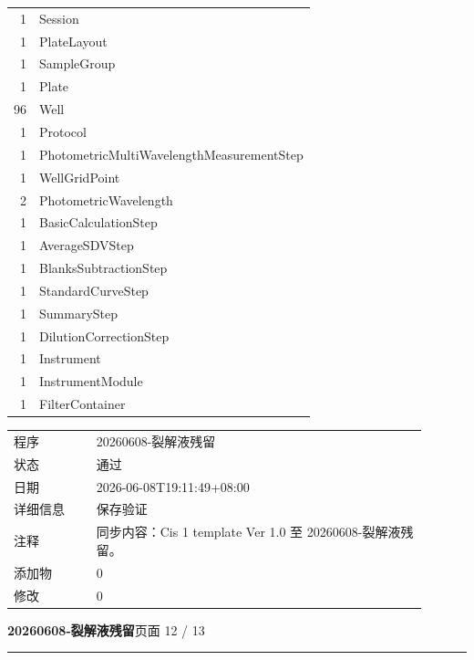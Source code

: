 \documentclass[UTF8,10pt,a4paper,fontset=fandol]{ctexart}
\newcommand{\fieldvalue}[1]{#1}
\begin{document}
\begin{tabular}{@{}r l@{}}
1 & Session\\
1 & PlateLayout\\
1 & SampleGroup\\
1 & Plate\\
96 & Well\\
1 & Protocol\\
1 & PhotometricMultiWavelengthMeasurementStep\\
1 & WellGridPoint\\
2 & PhotometricWavelength\\
1 & BasicCalculationStep\\
1 & AverageSDVStep\\
1 & BlanksSubtractionStep\\
1 & StandardCurveStep\\
1 & SummaryStep\\
1 & DilutionCorrectionStep\\
1 & Instrument\\
1 & InstrumentModule\\
1 & FilterContainer\\
\end{tabular}

\bigskip

\begin{tabular}{@{}p{0.18\linewidth}p{0.72\linewidth}@{}}
程序 & 
\fieldvalue{20260608-裂解液残留}\\
状态 &
\fieldvalue{通过}\\
日期 &
\fieldvalue{2026-06-08T19:11:49+08:00}\\
详细信息 & 保存验证\\
注释 & 同步内容：Cis 1 template Ver 1.0 至 20260608-裂解液残留。\\
添加物 &
\fieldvalue{0}\\
修改 &
\fieldvalue{0}\\
\end{tabular}

\newpage

\noindent\textbf{20260608-裂解液残留}\hfill 页面 12 / 13

\vspace{0.5em}
\hrule
\vspace{0.8em}
\end{document}
